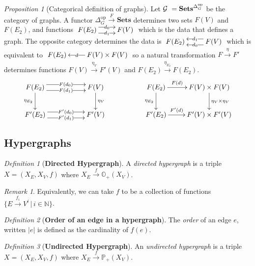 \documentclass[10pt]{article}
\newcommand{\onearrow}[3]{\mbox{$#1 \stackrel{#2}{\longrightarrow} #3$}}
\newcommand{\calG}{\mbox{${\cal G}\ $}}
\theoremstyle{remark}
\newtheorem{definition}{Definition}
\newtheorem{proposition}{Proposition}
\newtheorem{remark}{Remark}
\begin{document}
\begin{proposition}[Categorical definition of graphs]
Let $\calG = \mathbf{Sets}^{\Delta_G^{\text{op}}}$ be the category of graphs.
A functor \onearrow{\Delta_G^{\text{op}}}{F}{\mathbf{Sets}} determines two sets $F(V)$ and $F(E_2)$, and functions
$\xymatrix{
     F(E_2) \ar@<1ex>[r]|-{d_0} \ar@<-1ex>[r]|-{d_1} & F(V)
     } $ which is the data that defines a graph. The opposite category determines the data is
$\xymatrix{
     F(E_2) & F(V) \ar@<1ex>[l]|-{d_0} \ar@<-1ex>[l]|-{d_1}
     }$ which is equivalent to
$\xymatrix{
     F(E_2) & F(V) \times F(V) \ar[l]|-{d}
     }$
so a natural transformation \onearrow{F}{\eta}{F'} determines functions \onearrow{F(V)}{\eta_V}{F'(V)} and \onearrow{F(E_2)}{\eta_{E_2}}{F(E_2)}.
$$
\xymatrix{ 
F(E_2) \ar@<1ex>[rr]|-{F(d_0)} \ar@<-1ex>[rr]|-{F(d_1)} \ar[d]_{\eta_{E_2}} & & F(V) \ar[d]^{\eta_V} & & F(E_2) \ar[r]^-{F(d)}  \ar[d]_{\eta_{E_2}} & F(V) \times F(V) \ar[d]^{\eta_V \times \eta_V} \\
F'(E_2) \ar@<1ex>[rr]|-{F'(d_0)} \ar@<-1ex>[rr]|-{F'(d_1)} & & F'(V) & & F'(E_2) \ar[r]^-{F'(d)} & F'(V) \times F'(V)
}
$$
\end{proposition}

\subsection{Hypergraphs}


\begin{definition}[\textbf{Directed Hypergraph}]
A \emph{directed hypergraph} is a triple $X=(X_E, X_V, f)$ where \onearrow{X_E}{f}{\mathbb{O}_{+} (X_V)}.
\end{definition}

\begin{remark}
Equivalently, we can take $f$ to be a collection of functions $\{ \onearrow{E}{f_i}{V^i} \, | \, i \in \mathbb{N}\}$. 
\end{remark}

\begin{definition}[\textbf{Order of an edge in a hypergraph}]
The \emph{order} of an edge $e$, written $|e|$ is defined as the cardinality of $f(e)$.
\end{definition}

\begin{definition}[\textbf{Undirected Hypergraph}]
An \emph{undirected hypergraph} is a triple $X=(X_E, X_V, f)$ where \onearrow{X_E}{f}{\mathbb{P}_{+} (X_V)}.
\end{definition}
\end{document}
